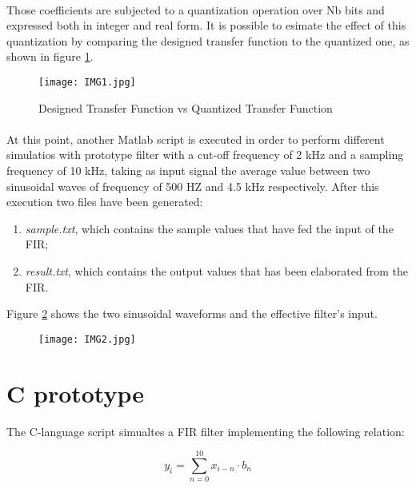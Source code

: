 \paragraph{}
Those coefficients are subjected to a quantization operation over Nb bits and expressed both in integer and real form.
It is possible to esimate the effect of this quantization by comparing the designed transfer function to the quantized one, as shown in figure \ref{fig:1}.
\begin{figure}[!ht]
	\caption{Designed Transfer Function vs Quantized Transfer Function}
	\label{fig:1}
	\texttt{[image: IMG1.jpg]}
	\centering
\end{figure}

\paragraph{}
At this point, another Matlab script is executed in order to perform
different simulatios with prototype filter with a cut-off frequency of 2 kHz and a sampling frequency of 10 kHz, taking as 
input signal the average value between two sinusoidal waves of frequency of 500 HZ and 4.5 kHz respectively.
After this execution two files have been generated:

\begin{enumerate}
	\item \emph{sample.txt}, which contains the sample values that have fed the input of the FIR;
	\item \emph{result.txt}, which contains the output values that has been elaborated from the FIR.
\end{enumerate}

Figure \ref{fig:2} shows the two sinusoidal waveforms and the effective filter's input.
\begin{figure}[!ht]
	\label{fig:2}
	\texttt{[image: IMG2.jpg]}
	\centering
\end{figure}


\section{C prototype}

The C-language script simualtes a FIR filter implementing the following  relation:

\begin{displaymath}[!h]
y_i = \sum_{n=0}^{10}{x_{i-n} \cdot b_n}
\end{displaymath}
